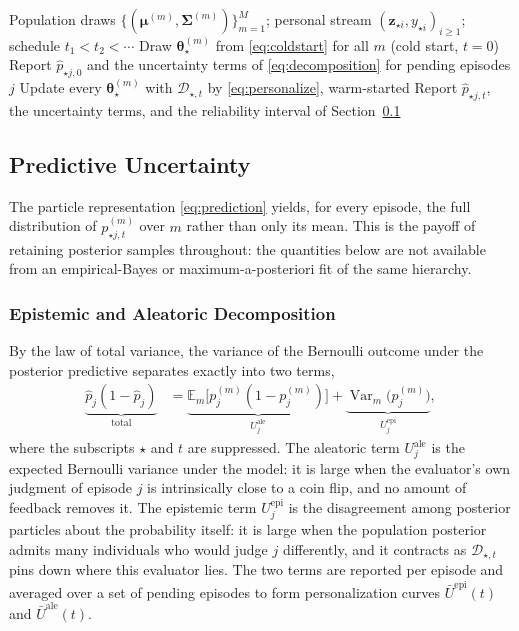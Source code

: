 \documentclass[lettersize,journal]{IEEEtran}
\newcommand{\E}{\mathbb{E}}
\newcommand{\Var}{\operatorname{Var}}
\newcommand{\D}{\mathcal{D}}
\newcommand{\newuser}{\star}
\begin{document}
\begin{algorithm}[t]
\caption{Cold start and sequential personalization}
\label{alg:personalization}
\begin{algorithmic}[1]
\REQUIRE Population draws $\{(\bm\mu^{(m)},\bm\Sigma^{(m)})\}_{m=1}^{M}$; personal stream $(\bm z_{\newuser i},y_{\newuser i})_{i\ge1}$; schedule $t_1<t_2<\cdots$
\STATE Draw $\bm\theta_{\newuser}^{(m)}$ from \eqref{eq:coldstart} for all $m$ \hfill (cold start, $t=0$)
\STATE Report $\widehat p_{\newuser j,0}$ and the uncertainty terms of \eqref{eq:decomposition} for pending episodes $j$
  \STATE Update every $\bm\theta_{\newuser}^{(m)}$ with $\D_{\newuser,t}$ by \eqref{eq:personalize}, warm-started
  \STATE Report $\widehat p_{\newuser j,t}$, the uncertainty terms, and the reliability interval of Section~\ref{sec:uncertainty}
\ENDFOR
\end{algorithmic}
\end{algorithm}

\subsection{Predictive Uncertainty}
\label{sec:uncertainty}

The particle representation \eqref{eq:prediction} yields, for every episode, the full distribution of $p^{(m)}_{\newuser j,t}$ over $m$ rather than only its mean. This is the payoff of retaining posterior samples throughout: the quantities below are not available from an empirical-Bayes or maximum-a-posteriori fit of the same hierarchy.

\subsubsection{Epistemic and Aleatoric Decomposition}
By the law of total variance, the variance of the Bernoulli outcome under the posterior predictive separates exactly into two terms,
\begin{equation}
\begin{split}
 \underbrace{\widehat p_{j}(1-\widehat p_{j})}_{\text{total}}
 &=\underbrace{\E_m\!\big[p^{(m)}_{j}(1-p^{(m)}_{j})\big]}_{U^{\mathrm{ale}}_{j}}
 +\underbrace{\Var_m\!\big(p^{(m)}_{j}\big)}_{U^{\mathrm{epi}}_{j}},
\end{split}
 \label{eq:decomposition}
\end{equation}
where the subscripts $\newuser$ and $t$ are suppressed. The aleatoric term $U^{\mathrm{ale}}_{j}$ is the expected Bernoulli variance under the model: it is large when the evaluator's own judgment of episode $j$ is intrinsically close to a coin flip, and no amount of feedback removes it. The epistemic term $U^{\mathrm{epi}}_{j}$ is the disagreement among posterior particles about the probability itself: it is large when the population posterior admits many individuals who would judge $j$ differently, and it contracts as $\D_{\newuser,t}$ pins down where this evaluator lies. The two terms are reported per episode and averaged over a set of pending episodes to form personalization curves $\bar U^{\mathrm{epi}}(t)$ and $\bar U^{\mathrm{ale}}(t)$.
\end{document}
